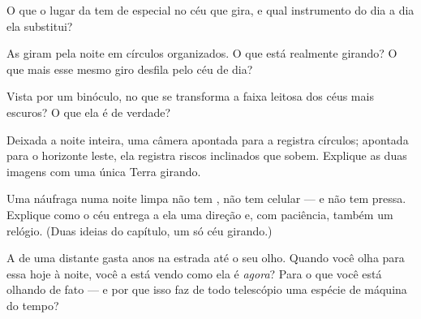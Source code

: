 \begin{exercise}[$\star$]\label{exo:g5:stars-night-sky:6}
O que o lugar da  tem de especial no céu que gira, e
qual instrumento do dia a dia ela substitui?
\end{exercise}

\begin{exercise}[$\star$]\label{exo:g5:stars-night-sky:7}
As  giram pela noite em círculos organizados. O que está
realmente girando? O que mais esse mesmo giro desfila pelo céu de
dia?
\end{exercise}

\begin{exercise}[$\star$]\label{exo:g5:stars-night-sky:8}
Vista por um binóculo, no que se transforma a faixa leitosa dos céus
mais escuros? O que ela é de verdade?
\end{exercise}

\begin{exercise}[$\star\star$]\label{exo:g5:stars-night-sky:9}
Deixada a noite inteira, uma câmera apontada para a 
registra círculos; apontada para o horizonte leste, ela registra
riscos inclinados que sobem. Explique as duas imagens com uma única
Terra girando.
\end{exercise}

\begin{exercise}[$\star\star$]\label{exo:g5:stars-night-sky:10}
Uma náufraga numa noite limpa não tem , não tem celular --- e
não tem pressa. Explique como o céu entrega a ela uma direção e,
com paciência, também um relógio. (Duas ideias do capítulo, um só céu
girando.)
\end{exercise}

\begin{exercise}[$\star\star$]\label{exo:g5:stars-night-sky:11}
A  de uma  distante gasta anos na estrada até o seu olho.
Quando você olha para essa  hoje à noite, você a está vendo
como ela é \emph{agora}? Para o que você está olhando de fato --- e
por que isso faz de todo telescópio uma espécie de máquina do tempo?
\end{exercise}
